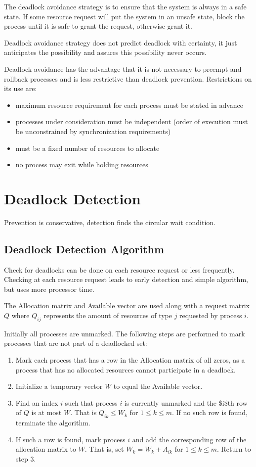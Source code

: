 \documentclass[11pt]{article}
\begin{document}
The deadlock avoidance strategy is to ensure that the system is always in a
safe state. If some resource request will put the system in an unsafe state,
block the process until it is safe to grant the request, otherwise grant it.

Deadlock avoidance strategy does not predict deadlock with certainty,
it just anticipates the possibility and assures this possibility never occurs.

Deadlock avoidance has the advantage that it is not necessary to preempt and
rollback processes and is less restrictive than deadlock prevention.
Restrictions on its use are:
\begin{itemize}
\item maximum resource requirement for each process must be stated in advance
\item processes under consideration must be independent (order of execution
must be unconstrained by synchronization requirements)
\item must be a fixed number of resources to allocate
\item no process may exit while holding resources
\end{itemize}
\section{Deadlock Detection}
\label{sec:org15b8594}
Prevention is conservative, detection finds the circular wait condition.
\subsection{Deadlock Detection Algorithm}
\label{sec:org376429b}
Check for deadlocks can be done on each resource request or less frequently.
Checking at each resource request leads to early detection and simple
algorithm, but uses more processor time.

The Allocation matrix and Available vector are used along with a request
matrix \(Q\) where \(Q_{ij}\) represents the amount of resources of type \(j\)
requested by process \(i\).

Initially all processes are unmarked. The following steps are performed to
mark processes that are not part of a deadlocked set:
\begin{enumerate}
\item Mark each process that has a row in the Allocation matrix of all zeros,
as a process that has no allocated resources cannot participate in a
deadlock.
\item Initialize a temporary vector \(W\) to equal the Available vector.
\item Find an index \(i\) such that process \(i\) is currently unmarked and the
\$i\$th row of \(Q\) is at most \(W\).
That is \(Q_{ik} \le W_{k}\) for \(1 \le k \le m\).
If no such row is found, terminate the algorithm.
\item If such a row is found, mark process \(i\) and add the corresponding row
of the allocation matrix to \(W\).
That is, set \(W_{k} = W_{k} + A_{ik}\) for \(1 \le k \le m\).
Return to step 3.
\end{enumerate}
\end{document}
